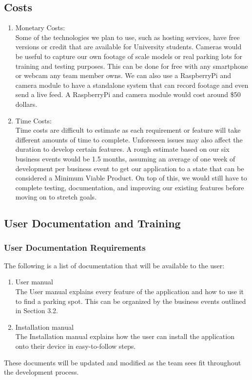 \documentclass[12pt,letterpaper]{article}
\begin{document}
\subsection{Costs}
\begin{enumerate}
    \item Monetary Costs: \\
    Some of the technologies we plan to use, such as hosting services, have free
    versions or credit that are available for University students. Cameras would
    be useful to capture our own footage of scale models or real parking lots
    for training and testing purposes. This can be done for free with any
    smartphone or webcam any team member owns. We can also use a RaspberryPi and
    camera module to have a standalone system that can record footage and even
    send a live feed. A RaspberryPi and camera module would cost around \$50
    dollars.
    
    \item Time Costs: \\
    Time costs are difficult to estimate as each requirement or feature will
    take different amounts of time to complete. Unforeseen issues may also
    affect the duration to develop certain features. A rough estimate based on
    our six business events would be 1.5 months, assuming an average of one week
    of development per business event to get our application to a state that can
    be considered a Minimum Viable Product. On top of this, we would still have
    to complete testing, documentation, and improving our existing features
    before moving on to stretch goals. 
    
\end{enumerate}

\subsection{User Documentation and Training}

\subsubsection{User Documentation Requirements}
The following is a list of documentation that will be available to the user:
\begin{enumerate}
    \item User manual \\
    The User manual explains every feature of the application and how to use it
    to find a parking spot. This can be organized by the business events
    outlined in Section 3.2. 
    \item Installation manual \\
    The Installation manual explains how the user can install the application
    onto their device in easy-to-follow steps.
\end{enumerate}
These documents will be updated and modified as the team sees fit throughout the
development process. 
\end{document}
